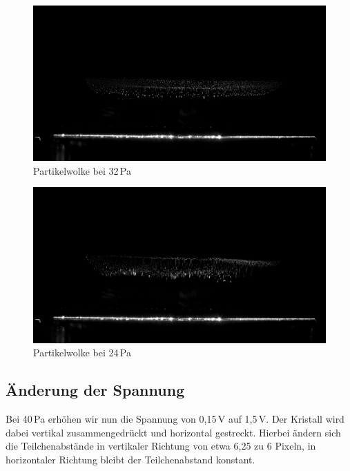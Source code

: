 \begin{figure}[ht]
    \centering
    \includegraphics[width=\textwidth]{data/32pa.jpg}
    \caption{Partikelwolke bei 32\,Pa}
    \label{fig:32pa}
\end{figure}

\begin{figure}[ht]
    \centering
    \includegraphics[width=\textwidth]{data/24pa.jpg}
    \caption{Partikelwolke bei 24\,Pa}
    \label{fig:24pa}
\end{figure}

\subsection{Änderung der Spannung}
Bei 40\,Pa erhöhen wir nun die Spannung von 0,15\,V auf 1,5\,V. Der Kristall wird dabei vertikal zusammengedrückt und horizontal gestreckt. Hierbei ändern sich die Teilchenabstände in vertikaler Richtung von etwa 6,25 zu 6 Pixeln, in horizontaler Richtung bleibt der Teilchenabstand konstant.


